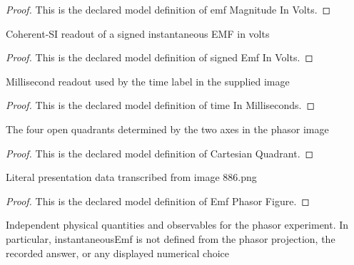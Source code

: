 \begin{proof}
  This is the declared model definition of emf Magnitude In Volts.
\end{proof}
\begin{definition}
  \label{def:physics:phyx-mini-0886:phyxminiproblems-problemphyxmini0886-signedemfinvolts}
  Coherent-SI readout of a signed instantaneous EMF in volts
\end{definition}
\begin{proof}
  This is the declared model definition of signed Emf In Volts.
\end{proof}
\begin{definition}
  \label{def:physics:phyx-mini-0886:phyxminiproblems-problemphyxmini0886-timeinmilliseconds}
  Millisecond readout used by the time label in the supplied image
\end{definition}
\begin{proof}
  This is the declared model definition of time In Milliseconds.
\end{proof}
\begin{definition}
  \label{def:physics:phyx-mini-0886:phyxminiproblems-problemphyxmini0886-cartesianquadrant}
  The four open quadrants determined by the two axes in the phasor image
\end{definition}
\begin{proof}
  This is the declared model definition of Cartesian Quadrant.
\end{proof}
\begin{definition}
  \label{def:physics:phyx-mini-0886:phyxminiproblems-problemphyxmini0886-emfphasorfigure}
  Literal presentation data transcribed from image 886.png
\end{definition}
\begin{proof}
  This is the declared model definition of Emf Phasor Figure.
\end{proof}
\begin{definition}
  \label{def:physics:phyx-mini-0886:phyxminiproblems-problemphyxmini0886-emfphasorsetup}
  Independent physical quantities and observables for the phasor experiment. In particular, instantaneousEmf is not defined from the phasor projection, the recorded answer, or any displayed numerical choice
\end{definition}
